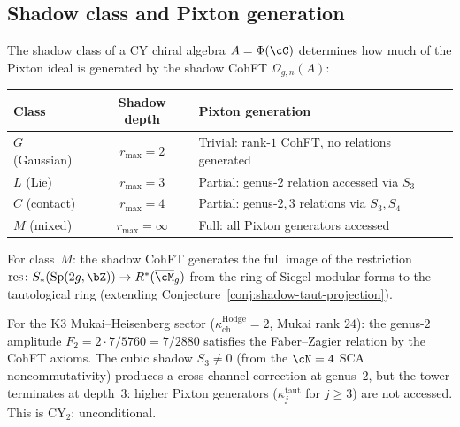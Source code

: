 \subsection{Shadow class and Pixton generation}

\begin{conjecture}
\label{conj:shadow-pixton-generation}
\ClaimStatusConjectured
{}
The shadow class of a CY chiral algebra $A = \Phi(\cC)$ determines how much of the Pixton ideal is generated by the shadow CohFT $\Omega_{g,n}(A)$:
\begin{center}
\begin{tabular}{lcl}
\toprule
\textbf{Class} & \textbf{Shadow depth} & \textbf{Pixton generation} \\
\midrule
$G$ (Gaussian) & $r_{\max} = 2$ & Trivial: rank-$1$ CohFT, no relations generated \\
$L$ (Lie) & $r_{\max} = 3$ & Partial: genus-$2$ relation accessed via $S_3$ \\
$C$ (contact) & $r_{\max} = 4$ & Partial: genus-$2{,}3$ relations via $S_3, S_4$ \\
$M$ (mixed) & $r_{\max} = \infty$ & Full: all Pixton generators accessed \\
\bottomrule
\end{tabular}
\end{center}
For class~$M$: the shadow CohFT generates the full image of the restriction $\mathrm{res} \colon S_*(\mathrm{Sp}(2g,\bZ)) \to R^*(\overline{\cM}_g)$ from the ring of Siegel modular forms to the tautological ring (extending Conjecture~\ref{conj:shadow-taut-projection}).
\end{conjecture}

\begin{remark}[The \texorpdfstring{$K3$}{K3} case: class~\texorpdfstring{$L$}{L}, Pixton at \texorpdfstring{$g = 2$}{g = 2}]
\label{rem:k3-pixton-genus2}
For the K3 Mukai--Heisenberg sector ($\kappa_{\mathrm{ch}}^{\mathrm{Hodge}} = 2$, Mukai rank $24$): the genus-$2$ amplitude $F_2 = 2 \cdot 7/5760 = 7/2880$ satisfies the Faber--Zagier relation by the CohFT axioms. The cubic shadow $S_3 \neq 0$ (from the $\cN = 4$ SCA noncommutativity) produces a cross-channel correction at genus~$2$, but the tower terminates at depth~$3$: higher Pixton generators ($\kappa_j^{\mathrm{taut}}$ for $j \geq 3$) are not accessed. This is CY$_2$: unconditional.
\end{remark}

